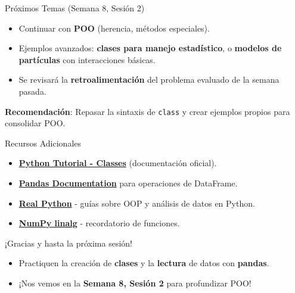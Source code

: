 \documentclass[10pt]{beamer}
\begin{document}
\begin{frame}{Próximos Temas (Semana 8, Sesión 2)}
  \begin{itemize}
    \item Continuar con \textbf{POO} (herencia, métodos especiales).
    \item Ejemplos avanzados: \textbf{clases para manejo estadístico}, o \textbf{modelos de partículas} con interacciones básicas.
    \item Se revisará la \textbf{retroalimentación} del problema evaluado de la semana pasada.
  \end{itemize}
  \vspace{0.3cm}
  \textbf{Recomendación}: Repasar la sintaxis de \texttt{class} y crear ejemplos propios para consolidar POO.
\end{frame}

\begin{frame}{Recursos Adicionales}
  \begin{itemize}
    \item \href{https://docs.python.org/3/tutorial/classes.html}{\textbf{Python Tutorial - Classes}} (documentación oficial).
    \item \href{https://pandas.pydata.org/}{\textbf{Pandas Documentation}} para operaciones de DataFrame.
    \item \href{https://realpython.com/}{\textbf{Real Python}} - guías sobre OOP y análisis de datos en Python.
    \item \href{https://numpy.org/doc/stable/reference/routines.linalg.html}{\textbf{NumPy linalg}} - recordatorio de funciones.
  \end{itemize}
\end{frame}

\begin{frame}
  \Huge{\centerline{¡Gracias y hasta la próxima sesión!}}
  \vspace{0.4cm}
  \normalsize
  \begin{itemize}
    \item Practiquen la creación de \textbf{clases} y la \textbf{lectura} de datos con \textbf{pandas}.
    \item ¡Nos vemos en la \textbf{Semana 8, Sesión 2} para profundizar POO!
  \end{itemize}
\end{frame}
\end{document}
